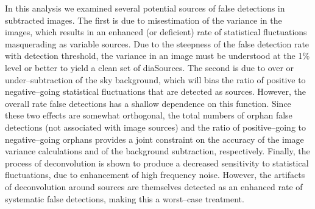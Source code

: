 \documentclass[floatfix, apj]{emulateapj}
\begin{document}


In this analysis we examined several potential sources of false detections in subtracted images.
The first is due to misestimation of the variance in the images, which results in an enhanced (or deficient) rate of statistical fluctuations masquerading as variable sources.
Due to the steepness of the false detection rate with detection threshold, the variance in an image must be understood at the 1\% level or better to yield a clean set of diaSources.
The second is due to over or under--subtraction of the sky background, which will bias the ratio of positive to negative--going statistical fluctuations that are detected as sources.
However, the overall rate false detections has a shallow dependence on this function.
Since these two effects are somewhat orthogonal, the total numbers of orphan false detections (not associated with image sources) and the ratio of positive--going to negative--going orphans provides a joint constraint on the accuracy of the image variance calculations and of the background subtraction, respectively.
Finally, the process of deconvolution is shown to produce a decreased sensitivity to statistical fluctuations, due to enhancement of high frequency noise.
However, the artifacts of deconvolution around sources are themselves detected as an enhanced rate of systematic false detections, making this a worst--case treatment.
\end{document}
